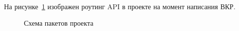 
На рисунке~\ref{route-struct-add} изображен роутинг API в проекте на момент написания ВКР.

\begin{figure}
    
    \caption{Схема пакетов проекта}
    \label{route-struct-add}
\end{figure}